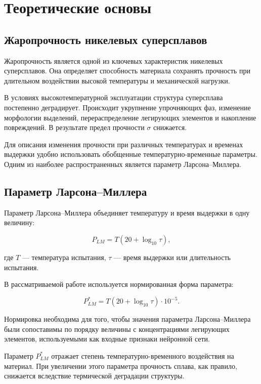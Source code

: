 \section{Теоретические основы}

\subsection{Жаропрочность никелевых суперсплавов}

Жаропрочность является одной из ключевых характеристик никелевых 
суперсплавов. Она определяет способность материала сохранять прочность 
при длительном воздействии высокой температуры и механической нагрузки.

В условиях высокотемпературной эксплуатации структура суперсплава 
постепенно деградирует. Происходит укрупнение упрочняющих фаз, 
изменение морфологии выделений, перераспределение легирующих элементов и 
накопление повреждений. В результате предел прочности $\sigma$ снижается.

Для описания изменения прочности при различных температурах и временах 
выдержки удобно использовать обобщенные температурно-временные параметры. 
Одним из наиболее распространенных является параметр Ларсона--Миллера.

\subsection{Параметр Ларсона--Миллера}

Параметр Ларсона--Миллера объединяет температуру и время выдержки в 
одну величину:

\begin{equation}
P_{LM} =
T
\left(
20 + \log_{10}\tau
\right),
\end{equation}

где $T$ --- температура испытания, $\tau$ --- время выдержки или 
длительность испытания.

В рассматриваемой работе используется нормированная форма параметра:

\begin{equation}
P_{LM}^{*} =
T
\left(
20 + \log_{10}\tau
\right)
\cdot 10^{-5}.
\end{equation}

Нормировка необходима для того, чтобы значения параметра Ларсона--Миллера 
были сопоставимы по порядку величины с концентрациями легирующих элементов, 
используемыми как входные признаки нейронной сети.

Параметр $P_{LM}^{*}$ отражает степень температурно-временного 
воздействия на материал. При увеличении этого параметра прочность 
сплава, как правило, снижается вследствие термической деградации 
структуры.

